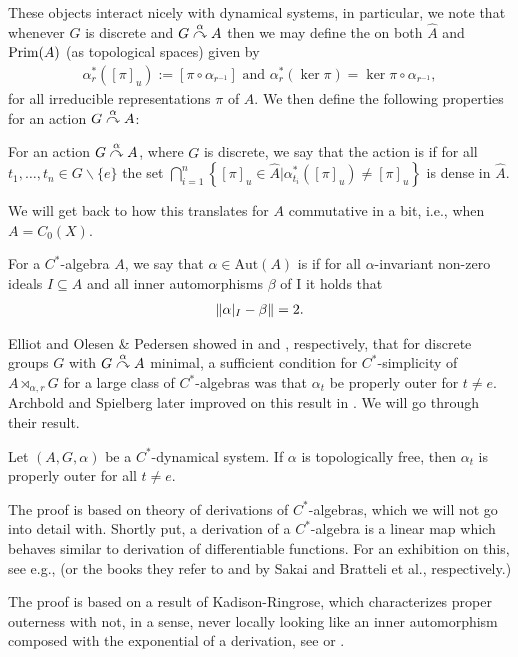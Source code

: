 These objects interact nicely with dynamical systems, in particular, we note that whenever $G$ is discrete and $G \stackrel{\alpha}{\curvearrowright} A$ then we may define the  on both $\hat A$ and $\mathrm{Prim}(A)$ (as topological spaces) given by
\begin{align*}
	\alpha_r^*([\pi]_u) := [\pi \circ \alpha_{r^{-1}}] \text{ and } \alpha_{r}^*(\ker \pi) = \ker \pi \circ \alpha_{r^{-1}},
\end{align*}
for all irreducible representations $\pi$ of $A$. We then define the following properties for an action $ G \stackrel{\alpha}{\curvearrowright} A$:
\begin{definition}
	For an action $G \stackrel{\alpha}{\curvearrowright} A$, where $G$ is discrete, we say that the action is  if for all $t_1,\dots,t_n \in G\backslash\{e\}$ the set $\bigcap_{i=1}^n \left\{ [\pi]_u \in \hat A | \alpha_{t_i}^*([\pi]_u)\neq [\pi]_u \right\}$ is dense in $\hat A$.
\end{definition}
We will get back to how this translates for $A$ commutative in a bit, i.e., when $A=C_0(X)$. 
\begin{definition}
	For a $C^*$-algebra $A$, we say that $\alpha \in \mathrm{Aut}(A)$ is  if for all $\alpha$-invariant non-zero ideals $I \subseteq A$ and all inner automorphisms $\beta$ of I it holds that
	\begin{align*}
		\left\lVert \alpha|_I - \beta \right\rVert = 2.
	\end{align*}
\end{definition}
Elliot and Olesen \& Pedersen showed in \cite[Theorem 3.2]{elliott1980some} and \cite[Theorem 7.2]{olesenpedersen3}, respectively, that for discrete groups $G$ with $G \stackrel{\alpha}{\curvearrowright} A$ minimal, a sufficient condition for $C^*$-simplicity of $A \rtimes_{\alpha,r} G$ for a large class of $C^*$-algebras was that $\alpha_t$ be properly outer for $t \neq e$. Archbold and Spielberg later improved on this result in \cite{archbold1994topologically}. We will go through their result. 
\begin{proposition}
	Let $(A,G,\alpha)$ be a $C^*$-dynamical system. If $\alpha$ is topologically free, then $\alpha_t$ is properly outer for all $t \neq e$.
\end{proposition}
\begin{remark}
	The proof is based on theory of derivations of $C^*$-algebras, which we will not go into detail with. Shortly put, a derivation of a $C^*$-algebra is a linear map which behaves similar to derivation of differentiable functions. For an exhibition on this, see e.g., \cite[Chapter 8.6]{pedersenalgauto} (or the books they refer to \cite{sakai1978recent} and \cite{bratteli2012operator} by Sakai and Bratteli et al., respectively.) 

	The proof is based on a result of Kadison-Ringrose, which characterizes proper outerness with not, in a sense, never locally looking like an inner automorphism composed with the exponential of a derivation, see \cite{kadison1967derivations} or \cite[Theorem 6.6 (i) and (ii)]{olesenpedersen3}.
\end{remark}




